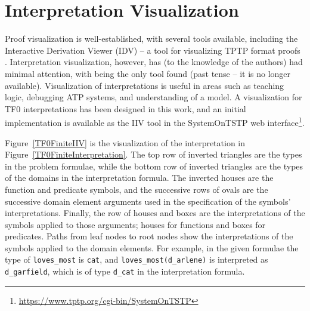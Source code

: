 \documentclass[letterpaper]{article}
\newcommand{\smalltt}[1]{\small \texttt{#1}}
\begin{document}
{%
\section{Interpretation Visualization}
\label{Visualization}

Proof visualization is well-established, with several tools available, including the Interactive 
Derivation Viewer (IDV) -- a tool for visualizing TPTP format proofs \cite{TPS07}.
Interpretation visualization, however, has (to the knowledge of the authors) had minimal 
attention, with \cite{Sch13-MS} being the only tool found (past tense -- it is no longer
available).
Visualization of interpretations is useful in areas such as teaching logic, debugging ATP 
systems, and understanding of a model.
A visualization for TF0 interpretations has been designed in this work, and an initial
implementation is available as the IIV tool in the SystemOnTSTP web interface\footnote{%
\url{https://www.tptp.org/cgi-bin/SystemOnTSTP}}.

Figure~\ref{TF0FiniteIIV} is the visualization of the interpretation in 
Figure~\ref{TF0FiniteInterpretation}.
The top row of inverted triangles are the types in the problem formulae,
while the bottom row of inverted triangles are the types of the domains in the interpretation
formula.
The inverted houses are the function and predicate symbols, and the successive rows of ovals are 
the successive domain element arguments used in the specification of the symbols' interpretations.
Finally, the row of houses and boxes are the interpretations of the symbols applied to those
arguments; houses for functions and boxes for predicates.
Paths from leaf nodes to root nodes show the interpretations of the symbols applied to the 
domain elements.
For example, in the given formulae the type of {\smalltt{loves\_most}} is {\smalltt{cat}},
and {\smalltt{loves\_most(d\_arlene)}} is interpreted as {\smalltt{d\_garfield}}, which is of type
{\smalltt{d\_cat}} in the interpretation formula.

}
\end{document}
